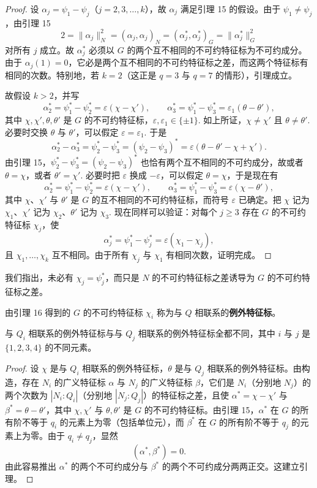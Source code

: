 \begin{proof}
设 \(\alpha_j = \psi_1-\psi_j\)（\(j = 2, 3, \ldots, k\)），故 \(\alpha_j\) 满足引理 15 的假设。由于 \(\psi_1 \neq \psi_j\)，由引理 15
\[
2 = \|\alpha_j\|_N^2 = (\alpha_j, \alpha_j)_N = (\alpha_j^*, \alpha_j^*)_G = \|\alpha_j^*\|_G^2
\]
对所有 \(j\) 成立。故 \(\alpha_j^*\) 必须以 \(G\) 的两个互不相同的不可约特征标为不可约成分。由于 \(\alpha_j(1) = 0\)，它必是两个互不相同的不可约特征标之差，而这两个特征标有相同的次数。特别地，若 \(k = 2\)（这正是 \(q = 3\) 与 \(q = 7\) 的情形），引理成立。

故假设 \(k > 2\)，并写
\[
\alpha_2^* = \psi_1^*-\psi_2^* = \varepsilon(\chi-\chi'), \qquad \alpha_3^* = \psi_1^*-\psi_3^* = \varepsilon_1(\theta-\theta'),
\]
其中 \(\chi, \chi', \theta, \theta'\) 是 \(G\) 的不可约特征标，\(\varepsilon, \varepsilon_1 \in \{\pm1\}\). 如上所证，\(\chi \neq \chi'\) 且 \(\theta \neq \theta'\). 必要时交换 \(\theta\) 与 \(\theta'\)，可以假定 \(\varepsilon = \varepsilon_1\). 于是
\[
\alpha_2^*-\alpha_3^* = \psi_2^*-\psi_3^* = (\psi_2-\psi_3)^* = \varepsilon(\theta-\theta'-\chi+\chi').
\]
由引理 15，\(\psi_2^*-\psi_3^* = (\psi_2-\psi_3)^*\) 也恰有两个互不相同的不可约成分，故或者 \(\theta = \chi\)，或者 \(\theta' = \chi'\). 必要时把 \(\varepsilon\) 换成 \(-\varepsilon\)，可以假定 \(\theta = \chi\)，于是现在有
\[
\alpha_2^* = \psi_1^*-\psi_2^* = \varepsilon(\chi-\chi'), \qquad \alpha_3^* = \psi_1^*-\psi_3^* = \varepsilon(\chi-\theta'),
\]
其中 \(\chi\)、\(\chi'\) 与 \(\theta'\) 是 \(G\) 的互不相同的不可约特征标，而符号 \(\varepsilon\) 已确定。把 \(\chi\) 记为 \(\chi_1\)、\(\chi'\) 记为 \(\chi_2\)、\(\theta'\) 记为 \(\chi_3\). 现在同样可以验证：对每个 \(j \geq 3\) 存在 \(G\) 的不可约特征标 \(\chi_j\)，使
\[
\alpha_j^* = \psi_1^*-\psi_j^* = \varepsilon(\chi_1-\chi_j),
\]
且 \(\chi_1, \ldots, \chi_k\) 互不相同。由于所有 \(\chi_j\) 与 \(\chi_1\) 有相同次数，证明完成。
\end{proof}

我们指出，未必有 \(\chi_j = \psi_j^*\)，而只是 \(N\) 的不可约特征标之差诱导为 \(G\) 的不可约特征标之差。

由引理 16 得到的 \(G\) 的不可约特征标 \(\chi_i\) 称为与 \(Q\) 相联系的\textbf{例外特征标}。

\begin{lemma}\label{lem:19.17}
与 \(Q_i\) 相联系的例外特征标与与 \(Q_j\) 相联系的例外特征标全都不同，其中 \(i\) 与 \(j\) 是 \(\{1,2,3,4\}\) 的不同元素。
\end{lemma}

\begin{proof}
设 \(\chi\) 是与 \(Q_i\) 相联系的例外特征标，\(\theta\) 是与 \(Q_j\) 相联系的例外特征标。由构造，存在 \(N_i\) 的广义特征标 \(\alpha\) 与 \(N_j\) 的广义特征标 \(\beta\)，它们是 \(N_i\)（分别地 \(N_j\)）的两个次数为 \(|N_i:Q_i|\)（分别地 \(|N_j:Q_j|\)）的特征标之差，且使 \(\alpha^* = \chi-\chi'\) 与 \(\beta^* = \theta-\theta'\)，其中 \(\chi, \chi'\) 与 \(\theta, \theta'\) 是 \(G\) 的不可约特征标。由引理 15，\(\alpha^*\) 在 \(G\) 的所有阶不等于 \(q_i\) 的元素上为零（包括单位元），而 \(\beta^*\) 在 \(G\) 的所有阶不等于 \(q_j\) 的元素上为零。由于 \(q_i \neq q_j\)，显然
\[
(\alpha^*, \beta^*) = 0.
\]
由此容易推出 \(\alpha^*\) 的两个不可约成分与 \(\beta^*\) 的两个不可约成分两两正交。这建立引理。
\end{proof}

